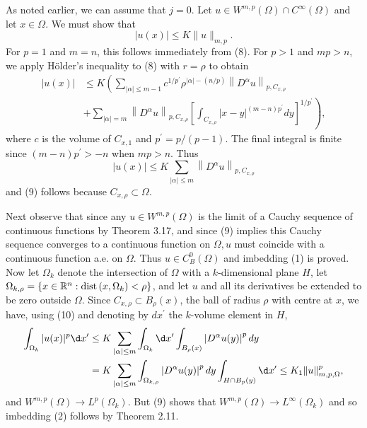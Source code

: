 \begin{para}
  As noted earlier, we can assume that $j=0$. Let $u \in W^{m,p}(\Omega) \cap C^{\infty}(\Omega)$ 
  and let $x \in \Omega$. We must show that
  \[
  |u(x)| \leq K\|u\|_{m,p} .
  \]
  For $p=1$ and $m=n$, this follows immediately from (8). For $p>1$ and $m p>n$,
  we apply Hölder's inequality to (8) with $r=\rho$ to obtain
  \[
  \begin{aligned}
  |u(x)| & \leq K\left(\sum_{|\alpha| \leq m-1} c^{1 / p^{\prime}} \rho^{|\alpha|-(n / p)}\left\|D^\alpha u\right\|_{p, C_{x, \rho}}\right. \\
  & \left.+\sum_{|\alpha|=m}\left\|D^\alpha u\right\|_{p, C_{x, \rho}}\left[\int_{C_{x, \rho}}|x-y|^{(m-n) p^{\prime}} d y\right]^{1 / p^{\prime}}\right),
  \end{aligned}
  \]
  where $c$ is the volume of $C_{x, 1}$ and $p^{\prime}=p /(p-1)$. The final integral is finite since $(m-n) p^{\prime}>-n$ when $m p>n$. Thus
  \[
  |u(x)| \leq K \sum_{|\alpha| \leq m}\left\|D^\alpha u\right\|_{p, C_{x, \rho}}
  \]
  and (9) follows because $C_{x, \rho} \subset \Omega$.
  
  Next observe that since any $u \in W^{m,p}(\Omega)$ is the limit of a Cauchy sequence of continuous functions 
  by Theorem 3.17, and since (9) implies this Cauchy sequence converges to a continuous function on $\Omega, u$ 
  must coincide with a continuous function a.e. on $\Omega$. Thus $u \in C_B^0(\Omega)$ and imbedding (1) is 
  proved.
  Now let $\Omega_k$ denote the intersection of $\Omega$ with a $k$-dimensional plane $H$,
  let $\Omega_{k, \rho}=\left\{x \in \mathbb{R}^n: \operatorname{dist}\left(x, \Omega_k\right)<\rho\right\}$, 
  and let $u$ and all its derivatives be extended to be zero outside $\Omega$.
  Since $C_{x, \rho} \subset B_\rho(x)$, the ball of radius $\rho$ with centre at $x$,
  we have, using (10) and denoting by $d x^{\prime}$ the $k$-volume element in $H$,
  \[
  \begin{aligned}
  \int_{\Omega_k}|u(x)|^p \d x^{\prime} & \leq K \sum_{|\alpha| \leq m} \int_{\Omega_k} \d x^{\prime} \int_{B_\rho(x)}\left|D^\alpha u(y)\right|^p d y \\
  & =K \sum_{|\alpha| \leq m} \int_{\Omega_{k, \rho}}\left|D^\alpha u(y)\right|^p d y \int_{H \cap B_p(y)} \d x^{\prime} \leq K_1\|u\|_{m, p, \Omega}^p,
  \end{aligned}
  \]
  and $W^{m,p}(\Omega) \rightarrow L^p(\Omega_k)$. But (9) shows that $W^{m,p}(\Omega) \rightarrow L^{\infty}(\Omega_k)$ and so imbedding (2) follows by Theorem 2.11.
\end{para}

